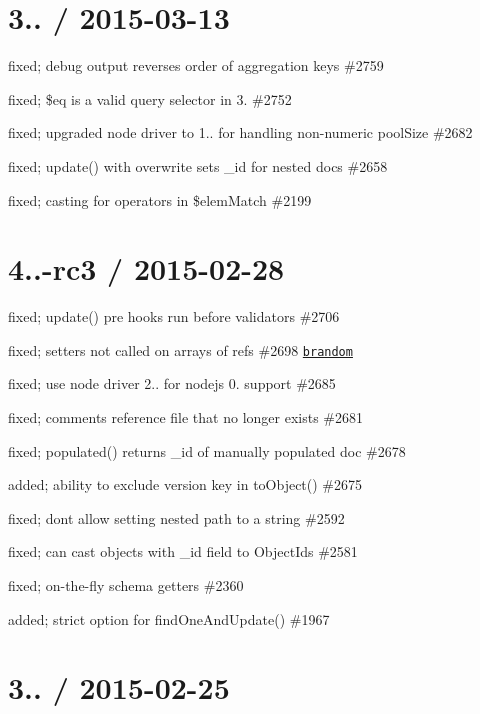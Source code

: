 \section*{3.. / 2015-\/03-\/13 }


\begin{DoxyItemize}
\item fixed; debug output reverses order of aggregation keys \#2759
\item fixed; \$eq is a valid query selector in 3. \#2752
\item fixed; upgraded node driver to 1.. for handling non-\/numeric pool\+Size \#2682
\item fixed; update() with overwrite sets \+\_\+id for nested docs \#2658
\item fixed; casting for operators in \$elem\+Match \#2199
\end{DoxyItemize}

\section*{4..-\/rc3 / 2015-\/02-\/28 }


\begin{DoxyItemize}
\item fixed; update() pre hooks run before validators \#2706
\item fixed; setters not called on arrays of refs \#2698 \href{https://github.com/brandom}{\tt brandom}
\item fixed; use node driver 2.. for nodejs 0. support \#2685
\item fixed; comments reference file that no longer exists \#2681
\item fixed; populated() returns \+\_\+id of manually populated doc \#2678
\item added; ability to exclude version key in to\+Object() \#2675
\item fixed; dont allow setting nested path to a string \#2592
\item fixed; can cast objects with \+\_\+id field to Object\+Ids \#2581
\item fixed; on-\/the-\/fly schema getters \#2360
\item added; strict option for find\+One\+And\+Update() \#1967
\end{DoxyItemize}

\section*{3.. / 2015-\/02-\/25 }


